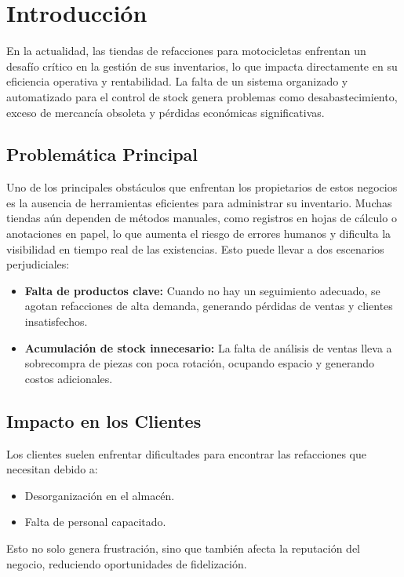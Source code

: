 
\section*{\centering Introducción}

En la actualidad, las tiendas de refacciones para motocicletas enfrentan un desafío 
crítico en la gestión de sus inventarios, lo que impacta directamente en su eficiencia operativa y rentabilidad. 
La falta de un sistema organizado y automatizado para el control de stock genera problemas como desabastecimiento, exceso de mercancía obsoleta y pérdidas económicas significativas.

\subsection*{\centering Problemática Principal}
Uno de los principales obstáculos que enfrentan los propietarios de estos negocios es la ausencia de herramientas eficientes para administrar su inventario. Muchas tiendas aún dependen de métodos manuales, como registros en hojas de cálculo o anotaciones en papel, lo que aumenta el riesgo de errores humanos y dificulta la visibilidad en tiempo real de las existencias. Esto puede llevar a dos escenarios perjudiciales:

\begin{itemize}
    \item \textbf{Falta de productos clave:} Cuando no hay un seguimiento adecuado, se agotan refacciones de alta demanda, generando pérdidas de ventas y clientes insatisfechos.
    \item \textbf{Acumulación de stock innecesario:} La falta de análisis de ventas lleva a sobrecompra de piezas con poca rotación, ocupando espacio y generando costos adicionales.
\end{itemize}

\subsection*{\centering Impacto en los Clientes}
Los clientes suelen enfrentar dificultades para encontrar las refacciones que necesitan debido a:
\begin{itemize}
    \item Desorganización en el almacén.
    \item Falta de personal capacitado.
\end{itemize}

Esto no solo genera frustración, sino que también afecta la reputación del negocio, reduciendo oportunidades de fidelización.

